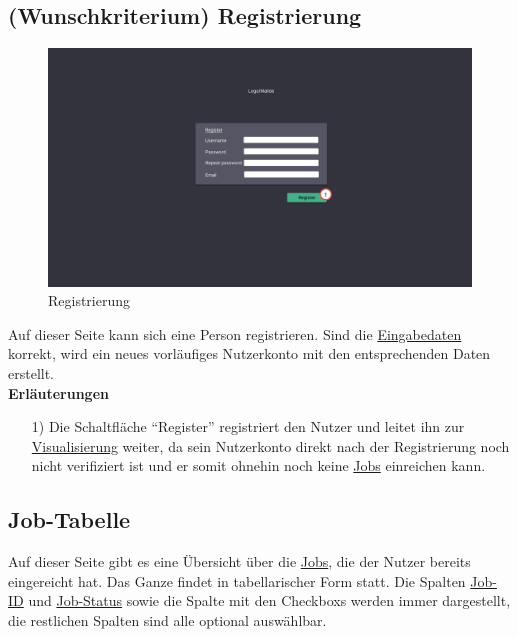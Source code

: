 \subsection{(Wunschkriterium) Registrierung}
\label{pages:register}
\begin{figure}[H]
    \centering
    \includegraphics[width=\textwidth]{images-interface/v4_interface/register_page_4.pdf}
    \caption{Registrierung}
    \label{fig:register}
\end{figure}
Auf dieser Seite kann sich eine Person registrieren. Sind die \hyperref[PD:Registrierungsdaten]{Eingabedaten} korrekt, wird ein neues vorläufiges \gls{Nutzerkonto} mit den entsprechenden Daten erstellt. \\


\textbf{Erläuterungen}
\begin{itemize}
    \item[1)] Die Schaltfläche \enquote{Register} registriert den \gls{Nutzer} und leitet ihn zur \hyperref[pages:visualization]{Visualisierung} weiter, da sein \gls{Nutzerkonto} direkt nach der Registrierung noch nicht verifiziert ist und er somit ohnehin noch keine \hyperref[B:Jobs]{Jobs} einreichen kann.
\end{itemize}



\newpage
\subsection{Job-Tabelle}
\label{pages:job-table}
Auf dieser Seite gibt es eine Übersicht über die \hyperref[B:Jobs]{Jobs}, die der \gls{Nutzer} bereits eingereicht hat. Das Ganze findet in tabellarischer Form statt. Die Spalten \hyperref[B:Job-ID]{Job-ID} und \hyperref[B:Job-Status]{Job-Status} sowie die Spalte mit den \glspl{Checkbox} werden immer dargestellt, die restlichen Spalten sind alle optional auswählbar.\\

